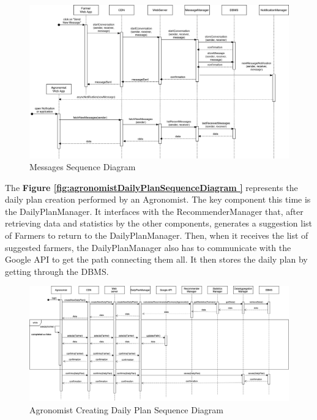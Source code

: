 \begin{figure}[hbt!]
\centering
\includegraphics[width=\textwidth]{../images_diagrams/dd/messagesSequenceDiagram.png}
\caption{Messages Sequence Diagram}
\label{fig:messagesSequenceDiagram}
\end{figure}

\begin{flushleft}
The  \textbf{Figure \ref{fig:agronomistDailyPlanSequenceDiagram }} represents the daily plan creation performed by an Agronomist. The key component this time is the DailyPlanManager. It interfaces with the RecommenderManager that, after retrieving data and statistics by the other components, generates a suggestion list of Farmers to return to the DailyPlanManager. Then, when it receives the list of suggested farmers, the DailyPlanManager also has to communicate with the Google API to get the path connecting them all. It then stores the daily plan by getting through the DBMS.

\end{flushleft}

\begin{figure}[hbt!]
\centering
\includegraphics[width=\textwidth]{../images_diagrams/dd/agronomist_sequencediagram.png}
\caption{Agronomist Creating Daily Plan Sequence Diagram}
\label{fig:agronomistDailyPlanSequenceDiagram}
\end{figure}

